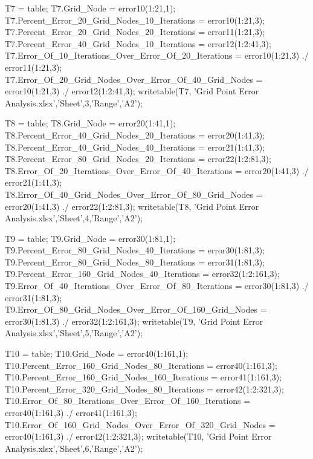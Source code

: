\documentclass[12pt]{article}
\begin{document}
\begin{verbatimtab}
T7 = table;
T7.Grid_Node = error10(1:21,1);
T7.Percent_Error_20_Grid_Nodes_10_Iterations = error10(1:21,3);
T7.Percent_Error_20_Grid_Nodes_20_Iterations = error11(1:21,3);
T7.Percent_Error_40_Grid_Nodes_10_Iterations = error12(1:2:41,3);
T7.Error_Of_10_Iterations_Over_Error_Of_20_Iterations = error10(1:21,3) ./ error11(1:21,3);
T7.Error_Of_20_Grid_Nodes_Over_Error_Of_40_Grid_Nodes = error10(1:21,3) ./ error12(1:2:41,3);
writetable(T7, 'Grid Point Error Analysis.xlsx','Sheet',3,'Range','A2');

T8 = table;
T8.Grid_Node = error20(1:41,1);
T8.Percent_Error_40_Grid_Nodes_20_Iterations = error20(1:41,3);
T8.Percent_Error_40_Grid_Nodes_40_Iterations = error21(1:41,3);
T8.Percent_Error_80_Grid_Nodes_20_Iterations = error22(1:2:81,3);
T8.Error_Of_20_Iterations_Over_Error_Of_40_Iterations = error20(1:41,3) ./ error21(1:41,3);
T8.Error_Of_40_Grid_Nodes_Over_Error_Of_80_Grid_Nodes = error20(1:41,3) ./ error22(1:2:81,3);
writetable(T8, 'Grid Point Error Analysis.xlsx','Sheet',4,'Range','A2');

T9 = table;
T9.Grid_Node = error30(1:81,1);
T9.Percent_Error_80_Grid_Nodes_40_Iterations = error30(1:81,3);
T9.Percent_Error_80_Grid_Nodes_80_Iterations = error31(1:81,3);
T9.Percent_Error_160_Grid_Nodes_40_Iterations = error32(1:2:161,3);
T9.Error_Of_40_Iterations_Over_Error_Of_80_Iterations = error30(1:81,3) ./ error31(1:81,3);
T9.Error_Of_80_Grid_Nodes_Over_Error_Of_160_Grid_Nodes = error30(1:81,3) ./ error32(1:2:161,3);
writetable(T9, 'Grid Point Error Analysis.xlsx','Sheet',5,'Range','A2');

T10 = table;
T10.Grid_Node = error40(1:161,1);
T10.Percent_Error_160_Grid_Nodes_80_Iterations = error40(1:161,3);
T10.Percent_Error_160_Grid_Nodes_160_Iterations = error41(1:161,3);
T10.Percent_Error_320_Grid_Nodes_80_Iterations = error42(1:2:321,3);
T10.Error_Of_80_Iterations_Over_Error_Of_160_Iterations = error40(1:161,3) ./ error41(1:161,3);
T10.Error_Of_160_Grid_Nodes_Over_Error_Of_320_Grid_Nodes = error40(1:161,3) ./ error42(1:2:321,3);
writetable(T10, 'Grid Point Error Analysis.xlsx','Sheet',6,'Range','A2');
\end{verbatimtab}

\setcounter{page}{1} \pagestyle{empty}


\end{document}
